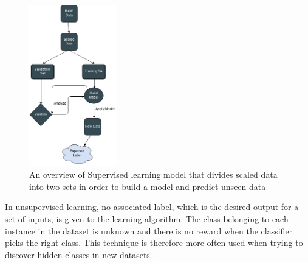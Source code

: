 \begin{figure}[H]
\centering
    \includegraphics[width=38mm,scale=0.3]{./img/SL.png}
    \caption{\footnotesize{An overview of Supervised learning model that divides scaled data into two sets in order to build a model and predict unseen data }}
    \label{fig:SL}
\end{figure}

In unsupervised learning, no associated label, which is the desired output for a set of inputs, is given to the learning algorithm. The class belonging to each instance in the dataset is unknown and there is no reward when the classifier picks the right class. This technique is therefore more often used when trying to discover hidden classes in new datasets \cite{maglogiannis2007emerging}.






